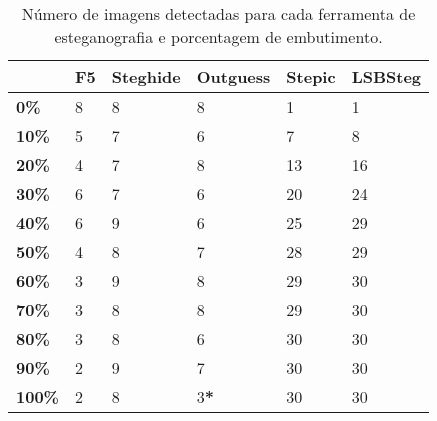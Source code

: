 \begin{table}[!ht]
  \begin{center}
    \begin{tabular}{|l|l|l|l|l|l|}
      \hline
& \textbf{F5} & \textbf{Steghide} & \textbf{Outguess} & \textbf{Stepic} & \textbf{LSBSteg} \\ \hline
\textbf{0\%} & 8 & 8 & 8 & 1 & 1 \\ \hline
\textbf{10\%} & 5 & 7 & 6 & 7 & 8 \\ \hline
\textbf{20\%} & 4 & 7 & 8 & 13 & 16 \\ \hline
\textbf{30\%} & 6 & 7 & 6 & 20 & 24 \\ \hline
\textbf{40\%} & 6 & 9 & 6 & 25 & 29 \\ \hline
\textbf{50\%} & 4 & 8 & 7 & 28 & 29 \\ \hline
\textbf{60\%} & 3 & 9 & 8 & 29 & 30 \\ \hline
\textbf{70\%} & 3 & 8 & 8 & 29 & 30 \\ \hline
\textbf{80\%} & 3 & 8 & 6 & 30 & 30 \\ \hline
\textbf{90\%} & 2 & 9 & 7 & 30 & 30 \\ \hline
\textbf{100\%} & 2 & 8 & 3\textbf{*} & 30 & 30 \\ \hline
    \end{tabular}
  \end{center}
  \caption{Número de imagens detectadas para cada ferramenta de esteganografia e porcentagem de embutimento.}
  \label{tab:summary-threshold-0-1}
\end{table}


